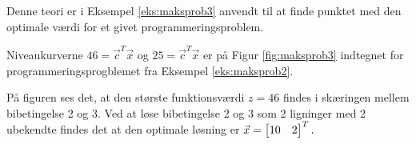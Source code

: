 %

Denne teori er i Eksempel \ref{eks:maksprob3} anvendt til at finde punktet med den optimale værdi for et givet programmeringsproblem.

\begin{eks}
Niveaukurverne $46=\vec{c}^T \vec{x}$ og $25=\vec{c}^T \vec{x}$ er på Figur \ref{fig:maksprob3} indtegnet for programmeringsprogblemet fra Eksempel \ref{eks:maksprob2}.

	\begin{center}	
		
		\label{fig:maksprob3}
	\end{center}
	
På figuren ses det, at den største funktionsværdi $z=46$ findes i skæringen mellem bibetingelse 2 og 3.
Ved at løse bibetingelse 2 og 3 som 2 ligninger med 2 ubekendte findes det at den optimale løsning er $\vec{x}=\begin{bmatrix} 10 & 2 \end{bmatrix}^T.$

\label{eks:maksprob3}
\end{eks}





